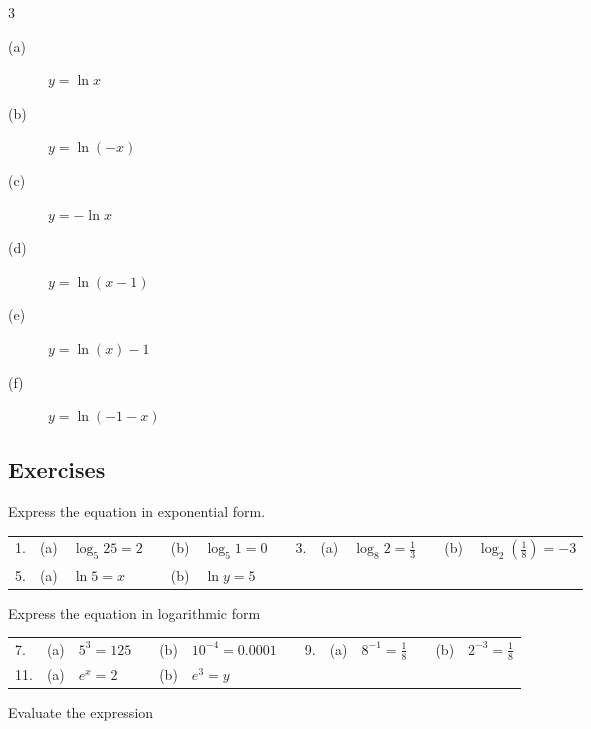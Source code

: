 \columnseprule =0pt
\columnsep =30pt
\begin {multicols}{3}
 


\begin{description}
\item [(a)] $y =\ln  x$ 

\item [(b)] $y =\ln  ( -x)$ 

\item [(c)] $y = -\ln  x$ 

\item [(d)] $y =\ln  (x -1)$ 

\item [(e)] $y =\ln  (x) -1$ 

\item [(f)] $y =\ln  ( -1 -x)$ \end{description}


\end {multicols}


\subsection{Exercises}
Express the equation in exponential form. 


\begin{tabular}[c]{lllllllllllll}1.  & (a)
& $\log _{5} 25 =2$  &  & (b)  & $\log _{5} 1 =0$  &  & 3.
& (a)  & $\log _{8} 2 =\frac{1}{3}$  &  & (b)  & $\log _{2} \genfrac{(}{)}{}{}{1}{8} = -3$  \\
5.  & (a)  & $\ln  5 =x$  &  & (b)  & $\ln  y =5$  &  &  &  &  &  &  & 
\end{tabular}

Express the equation in logarithmic form 


\begin{tabular}[c]{lllllllllllll}7.  & (a)
& $5^{3} =125$  &  & (b)  & $10^{ -4} =0.0001$  &  & 9.
& (a)  & $8^{ -1} =\frac{1}{8}$  &  & (b)  & $2^{ -3} =\frac{1}{8}$  \\
11.  & (a)  & $e^{x} =2$  &  & (b)  & $e^{3} =y$  &  &  &  &  &  &  & 
\end{tabular}

Evaluate the expression 


